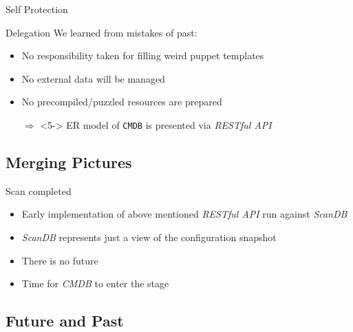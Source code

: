 \documentclass[ngerman,xcolor={table,dvipsnames},smaller,compress,hyperref={bookmarks,colorlinks}]{beamer}%
\begin{document}
\begin{frame}[fragile]{Self Protection}
\begin{block}{Delegation}
We learned from mistakes of past:
\begin{itemize}
\item<2-> No responsibility taken for filling weird puppet templates
\item<3-> No external data will be managed
\item<4-> No precompiled/puzzled resources are prepared
\item[$\Rightarrow$]<5-> ER model of \texttt{CMDB} is presented via \textit{RESTful API}
\end{itemize}
\end{block}
\end{frame}

\subsection{Merging Pictures}

\begin{frame}[fragile]{}
\begin{block}{Scan completed}
\begin{itemize}
\item Early implementation of above mentioned \textit{RESTful API} run against \textit{ScanDB}
\item<2-> \textit{ScanDB} represents just a view of the configuration snapshot
\item<3-> There is no future
\item<5-> Time for \textit{CMDB} to enter the stage
\end{itemize}
\end{block}
\end{frame}

\subsection{Future and Past}
\end{document}
